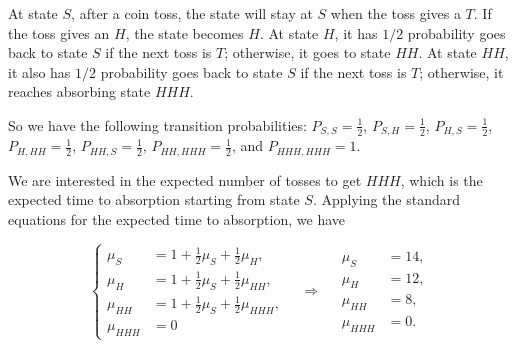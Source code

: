 
\begin{figure}[ht]
\centering
{}
\end{figure}

At state $S$, after a coin toss, the state will stay at $S$ when the toss gives a $T$. If the toss
gives an $H$, the state becomes $H$. At state $H$, it has $1/2$ probability goes back to state $S$ if
the next toss is $T$; otherwise, it goes to state $HH$. At state $HH$, it also has $1/2$ probability
goes back to state $S$ if the next toss is $T$; otherwise, it reaches absorbing state $HHH$.

So we have the following transition probabilities: $P_{S,S}=\frac{1}{2}$, $P_{S,H}=\frac{1}{2}$,
$P_{H,S}=\frac{1}{2}$, $P_{H,HH}=\frac{1}{2}$, $P_{HH,S}=\frac{1}{2}$,
$P_{HH,HHH}=\frac{1}{2}$, and $P_{HHH,HHH}=1$.

We are interested in the expected number of tosses to get $HHH$, which is the expected time to
absorption starting from state $S$. Applying the standard equations for the expected time to
absorption, we have

\[
\left\{
\begin{aligned}
\mu_S&=1+\tfrac{1}{2}\mu_S+\tfrac{1}{2}\mu_H,\\
\mu_H&=1+\tfrac{1}{2}\mu_S+\tfrac{1}{2}\mu_{HH},\\
\mu_{HH}&=1+\tfrac{1}{2}\mu_S+\tfrac{1}{2}\mu_{HHH},\\
\mu_{HHH}&=0
\end{aligned}
\right.
\quad\Rightarrow\quad
\begin{aligned}
\mu_S&=14,\\
\mu_H&=12,\\
\mu_{HH}&=8,\\
\mu_{HHH}&=0.
\end{aligned}
\]


